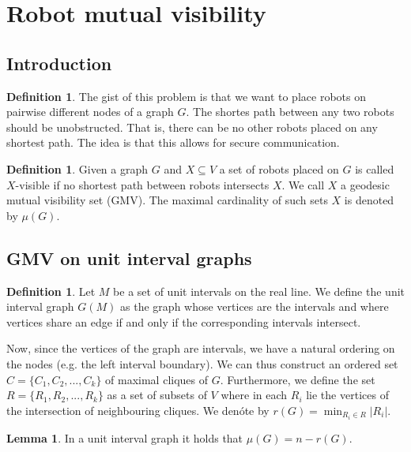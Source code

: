 \documentclass[a4paper, 12pt]{article}
\theoremstyle{plain}
\theoremstyle{definition}
\newtheorem{definition}[theorem]{Definition} %
\theoremstyle{lemma}
\newtheorem{lemma}[theorem]{Lemma}
\theoremstyle{remark}
\theoremstyle{corollary}
\theoremstyle{example}
\begin{document}
\section{Robot mutual visibility}
	\subsection{Introduction}
	\begin{definition}
		The gist of this problem is that we want to place robots on pairwise different nodes of a graph $G$. The shortes path between any two robots should be unobstructed. That is, there can be no other robots placed on any shortest path. The idea is that this allows for secure communication.
	\end{definition}
	\begin{definition}
		Given a graph $G$ and $X \subseteq V$ a set of robots placed on $G$ is called $X$-visible if no shortest path between robots intersects $X$. We call $X$ a geodesic mutual visibility set (GMV). The maximal cardinality of such sets $X$ is denoted by $\mu(G)$.
	\end{definition}
	\subsection{GMV on unit interval graphs}
	\begin{definition}
		Let $M$ be a set of unit intervals on the real line. We define the unit interval graph $G(M)$ as the graph whose vertices are the intervals and where vertices share an edge if and only if the corresponding intervals intersect. 
	\end{definition}
	Now, since the vertices of the graph are intervals, we have a natural ordering on the nodes (e.g. the left interval boundary). We can thus construct an ordered set $C = \{C_1,C_2,...,C_k\}$ of maximal cliques of $G$. Furthermore, we define the set $R = \{R_1,R_2,...,R_k\}$ as a set of subsets of $V$ where in each $R_i$ lie the vertices of the intersection of neighbouring cliques. We denóte by $r(G) = \min_{R_i \in R} \left|R_i\right|$.
	\begin{lemma}
		In a unit interval graph it holds that $\mu(G) = n - r(G)$.
	\end{lemma}
\end{document}

